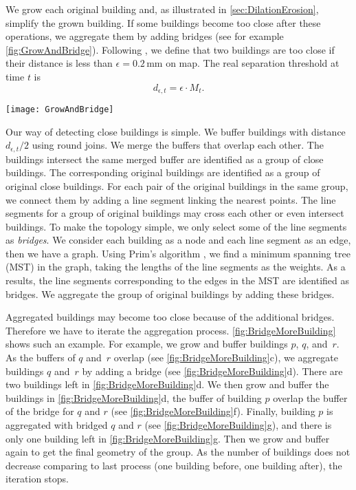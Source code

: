 We grow each original building and, as illustrated in 
\sect\ref{sec:DilationErosion}, simplify the grown building.
If some buildings become too close after these operations,
we aggregate them by adding bridges
(see for example \fig\ref{fig:GrowAndBridge}).
Following \citet{Stoter2009}, 
we define that two buildings are too close if their distance is less than
$\epsilon= 0.2\,\mathrm{mm}$ on map.
The real separation threshold at time $t$ is
\begin{equation}
\label{eq:d_epsilont}
d_{\epsilon, t} = \epsilon \cdot M_t.
\end{equation}

\begin{figure*}[tb]
	\centering
	\texttt{[image: GrowAndBridge]}
	\caption{Aggregating original buildings in the same group by introducing 
		bridges.
		Then grow the bridged buildings.}
	\label{fig:GrowAndBridge}
\end{figure*}

Our way of detecting close buildings is simple.
We buffer buildings with distance $d_{\epsilon, t}/2$ using round joins.
We merge the buffers that overlap each other.
The buildings intersect the same merged buffer 
are identified as a group of close buildings.
The corresponding original buildings 
are identified as a group of original close buildings.
For each pair of the original buildings in the same group,
we connect them by adding a line segment linking the nearest points.
The line segments for a group of original buildings may cross each other or 
even intersect buildings.
To make the topology simple, 
we only select some of the line segments as \emph{bridges}.  
We consider each building as a node and each line segment as an edge, 
then we have a graph.
Using Prim's algorithm \citep{Prim1957}, 
we find a minimum spanning tree (MST) in the graph,
taking the lengths of the line segments as the weights.
As a results, the line segments corresponding to the edges in the MST
are identified as bridges.
We aggregate the group of original buildings by adding these bridges.

Aggregated buildings may become too close because of the additional bridges.
Therefore we have to iterate the aggregation process.
\fig\ref{fig:BridgeMoreBuilding} shows such an example.
For example, we grow and buffer buildings $p$, $q$, and~$r$.
As the buffers of $q$ and~$r$ overlap
(see \fig\ref{fig:BridgeMoreBuilding}c),
we aggregate buildings $q$ and~$r$ by adding a bridge
(see \fig\ref{fig:BridgeMoreBuilding}d).
There are two buildings left in \fig\ref{fig:BridgeMoreBuilding}d.
We then grow and buffer the buildings in 
\fig\ref{fig:BridgeMoreBuilding}d, 
the buffer of building $p$ overlap the buffer of the bridge for $q$ and $r$
(see \fig\ref{fig:BridgeMoreBuilding}f).
Finally, building $p$ is aggregated with bridged $q$ and $r$
(see \fig\ref{fig:BridgeMoreBuilding}g), and
there is only one building left in \fig\ref{fig:BridgeMoreBuilding}g.
Then we grow and buffer again to get the final geometry of the group.
As the number of buildings does not decrease comparing to last process (one 
building before, one building after),
the iteration stops.

